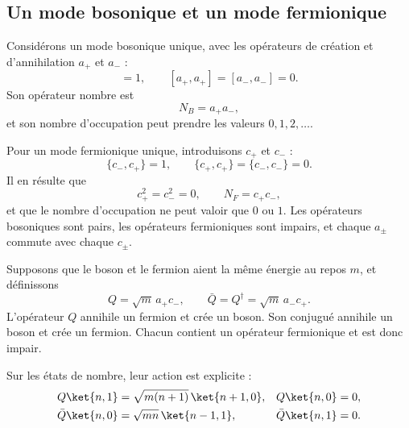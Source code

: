 \subsection{Un mode bosonique et un mode fermionique}

Considérons un mode bosonique unique, avec les opérateurs de création et d’annihilation \(a_+\) et \(a_-\) :
\begin{equation}
[a_-,a_+]=1,
\qquad
[a_+,a_+]=[a_-,a_-]=0.
\end{equation}
Son opérateur nombre est
\begin{equation}
N_B=a_+a_-,
\end{equation}
et son nombre d’occupation peut prendre les valeurs \(0,1,2,\ldots\).

Pour un mode fermionique unique, introduisons \(c_+\) et \(c_-\) :
\begin{equation}
\{c_-,c_+\}=1,
\qquad
\{c_+,c_+\}=\{c_-,c_-\}=0.
\end{equation}
Il en résulte que
\begin{equation}
c_+^2=c_-^2=0,
\qquad
N_F=c_+c_-,
\end{equation}
et que le nombre d’occupation ne peut valoir que \(0\) ou \(1\). Les opérateurs bosoniques sont pairs, les opérateurs fermioniques sont impairs, et chaque \(a_\pm\) commute avec chaque \(c_\pm\).


Supposons que le boson et le fermion aient la même énergie au repos \(m\), et définissons
\begin{equation}
Q=\sqrt m\,a_+c_-,
\qquad
\bar Q=Q^\dagger=\sqrt m\,a_-c_+.
\end{equation}
L’opérateur \(Q\) annihile un fermion et crée un boson. Son conjugué annihile un boson et crée un fermion. Chacun contient un opérateur fermionique et est donc impair.

Sur les états de nombre, leur action est explicite :
\begin{align}
Q\ket{n,1}
&=\sqrt{m(n+1)}\,\ket{n+1,0},
&
Q\ket{n,0}&=0,\\
\bar Q\ket{n,0}
&=\sqrt{mn}\,\ket{n-1,1},
&
\bar Q\ket{n,1}&=0.
\end{align}


